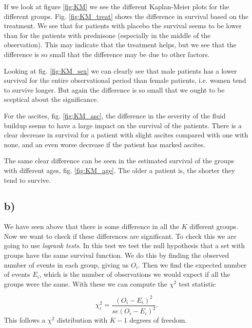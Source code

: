 \documentclass[a4paper,norsk, 10pt]{article}
\begin{document}
If we look at figure \ref{fig:KM} we see the different Kaplan-Meier plots for the different groups. Fig. \ref{fig:KM_treat} shows the difference in survival based on the treatment. We see that for patients with placebo the survival seems to be lower than for the patients with prednisone (especially in the middle of the observation). This may indicate that the treatment helps, but we see that the difference is so small that the difference may be due to other factors.

Looking at fig. \ref{fig:KM_sex} we can clearly see that male patients has a lower survival for the entire observational period than female patients, i.e. women tend to survive longer. But again the difference is so small that we ought to be sceptical about the significance.

For the ascites, fig. \ref{fig:KM_asc}, the difference in the severity of the fluid buildup seems to have a large impact on the survival of the patients. There is a clear decrease in survival for a patient with slight ascites compared with one with none, and an even worse decrease if the patient has marked ascites.

The same clear difference can be seen in the estimated survival of the groups with different ages, fig. \ref{fig:KM_age}. The older a patient is, the shorter they tend to survive.


\subsection{b)}

We have seen above that there is some difference in all the $K$ different groups. Now we want to check if these differences are significant. To check this we are going to use \textit{logrank tests}. In this test we test the null hypothesis that a set with groups have the same survival function. We do this by finding the observed number of events in each group, giving us $O_i$. Then we find the expected number of events $E_i$, which is the number of observations we would expect if all the groups were the same. With these we can compute the $\chi^2$ test statistic

\begin{equation}
\chi^2_i = \frac{(O_i - E_i)^2}{se(O_i-E_i)^2}.
\end{equation}
This follows a $\chi^2$ distribution with $K-1$ degrees of freedom.
\end{document}
